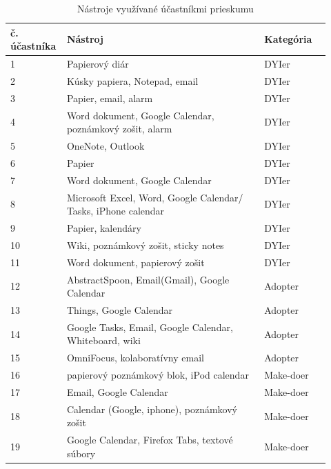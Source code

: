 \documentclass[10pt,slovak,a4paper]{article}
\begin{document}
		\par
		\begin{table}[tbh]
			
			\begin{center}
				\begin{tabular}{ | p{0.12\linewidth} | p{0.60\linewidth} | p{0.20\linewidth} | }
					\hline
						\textbf{č. účastníka} & \textbf{Nástroj} & \textbf{Kategória} \\ \hline
						1 & Papierový diár & DYIer \\ \hline
						2 & Kúsky papiera, Notepad, email & DYIer \\ \hline
						3 & Papier, email, alarm & DYIer \\ \hline
						4 & Word dokument, Google Calendar, poznámkový zošit, alarm & DYIer \\ \hline
						5 & OneNote, Outlook & DYIer \\ \hline
						6 & Papier & DYIer \\ \hline
						7 & Word dokument, Google Calendar & DYIer \\ \hline
						8 & Microsoft Excel, Word, Google Calendar/ Tasks, iPhone calendar & DYIer \\ \hline
						9 & Papier, kalendáry & DYIer \\ \hline
						10 & Wiki, poznámkový zošit, sticky notes & DYIer \\ \hline
						11 & Word dokument, papierový zošit & DYIer \\ \hline
						12 & AbstractSpoon, Email(Gmail), Google Calendar & Adopter \\ \hline
						13 & Things, Google Calendar & Adopter \\ \hline
						14 & Google Tasks, Email, Google Calendar, Whiteboard, wiki & Adopter \\ \hline
						15 & OmniFocus, kolaboratívny email & Adopter \\ \hline
						16 & papierový poznámkový blok, iPod calendar & Make-doer \\ \hline
						17 & Email, Google Calendar & Make-doer \\ \hline
						18 & Calendar (Google, iphone), poznámkový zošit & Make-doer \\ \hline
						19 & Google Calendar, Firefox Tabs, textové súbory & Make-doer \\ \hline
				\end{tabular}
				\caption{Nástroje využívané účastníkmi prieskumu \cite{Haraty}}
			\end{center}
		\end{table}
		
\end{document}
